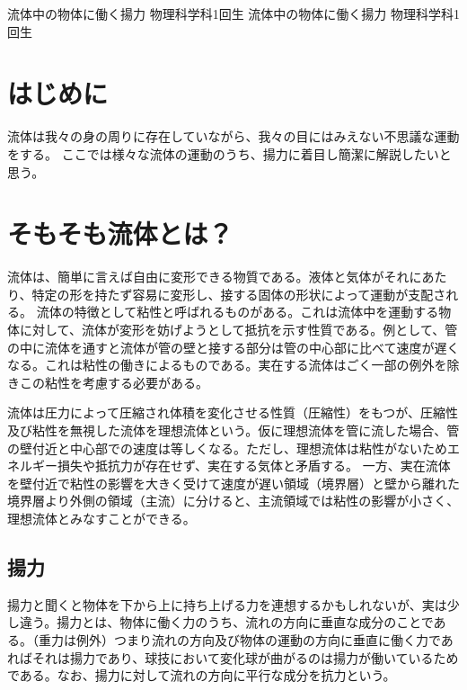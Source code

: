 \documentclass[10pt,b5paper,papersize,dvipdfmx]{jsbook}
\begin{document}

\kaishititle%
  {流体中の物体に働く揚力}%
  {物理科学科1回生}%
  {}%
\kaishititle%
  {流体中の物体に働く揚力}%
  {物理科学科1回生}%
  {}%

%
\section*{はじめに}
流体は我々の身の周りに存在していながら、我々の目にはみえない不思議な運動をする。
ここでは様々な流体の運動のうち、揚力に着目し簡潔に解説したいと思う。

\section{そもそも流体とは？}
流体は、簡単に言えば自由に変形できる物質である。液体と気体がそれにあたり、特定の形を持たず容易に変形し、接する固体の形状によって運動が支配される。
流体の特徴として粘性と呼ばれるものがある。これは流体中を運動する物体に対して、流体が変形を妨げようとして抵抗を示す性質である。例として、管の中に流体を通すと流体が管の壁と接する部分は管の中心部に比べて速度が遅くなる。これは粘性の働きによるものである。実在する流体はごく一部の例外を除きこの粘性を考慮する必要がある。
\par
流体は圧力によって圧縮され体積を変化させる性質（圧縮性）をもつが、圧縮性及び粘性を無視した流体を理想流体という。仮に理想流体を管に流した場合、管の壁付近と中心部での速度は等しくなる。ただし、理想流体は粘性がないためエネルギー損失や抵抗力が存在せず、実在する気体と矛盾する。
一方、実在流体を壁付近で粘性の影響を大きく受けて速度が遅い領域（境界層）と壁から離れた境界層より外側の領域（主流）に分けると、主流領域では粘性の影響が小さく、理想流体とみなすことができる。

\subsection{揚力}
揚力と聞くと物体を下から上に持ち上げる力を連想するかもしれないが、実は少し違う。揚力とは、物体に働く力のうち、流れの方向に垂直な成分のことである。（重力は例外）つまり流れの方向及び物体の運動の方向に垂直に働く力であればそれは揚力であり、球技において変化球が曲がるのは揚力が働いているためである。なお、揚力に対して流れの方向に平行な成分を抗力という。
\end{document}
